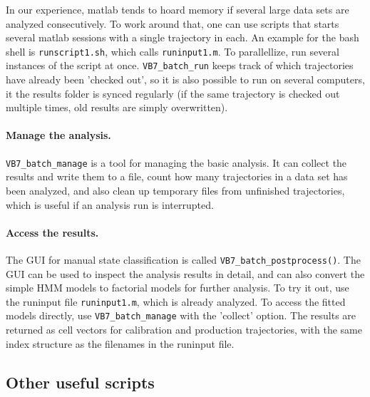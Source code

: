 In our experience, matlab tends to hoard memory if several large data
sets are analyzed consecutively.  To work around that, one can use
scripts that starts several matlab sessions with a single trajectory
in each. An example for the bash shell is \verb+runscript1.sh+, which
calls \verb+runinput1.m+. To parallellize, run several instances of
the script at once. \verb+VB7_batch_run+ keeps track of which
trajectories have already been 'checked out', so it is also possible
to run on several computers, it the results folder is synced regularly
(if the same trajectory is checked out multiple times, old results are
simply overwritten).


\paragraph{Manage the analysis.}
\verb+VB7_batch_manage+ is a tool for managing the basic analysis. It
can collect the results and write them to a file, count how many
trajectories in a data set has been analyzed, and also clean up
temporary files from unfinished trajectories, which is useful if an
analysis run is interrupted.

\paragraph{Access the results.} 
The GUI for manual state classification is called
\verb+VB7_batch_postprocess()+. The GUI can be used to inspect the
analysis results in detail, and can also convert the simple HMM models
to factorial models for further analysis. To try it out, use the
runinput file \verb+runinput1.m+, which is already analyzed. To access
the fitted models directly, use \verb+VB7_batch_manage+ with the
'collect' option. The results are returned as cell vectors for
calibration and production trajectories, with the same index structure
as the filenames in the runinput file.


\subsection{Other useful scripts}
